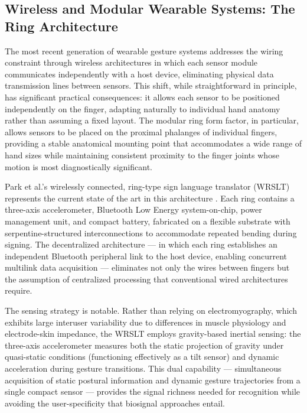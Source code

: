\documentclass[11pt, a4paper]{article}
\theoremstyle{definition}
\begin{document}
\subsection{Wireless and Modular Wearable Systems: The Ring Architecture}

The most recent generation of wearable gesture systems addresses the wiring constraint through wireless architectures in which each sensor module communicates independently with a host device, eliminating physical data transmission lines between sensors. This shift, while straightforward in principle, has significant practical consequences: it allows each sensor to be positioned independently on the finger, adapting naturally to individual hand anatomy rather than assuming a fixed layout. The modular ring form factor, in particular, allows sensors to be placed on the proximal phalanges of individual fingers, providing a stable anatomical mounting point that accommodates a wide range of hand sizes while maintaining consistent proximity to the finger joints whose motion is most diagnostically significant.

Park et al.'s wirelessly connected, ring-type sign language translator (WRSLT) represents the current state of the art in this architecture \cite{park2026}. Each ring contains a three-axis accelerometer, Bluetooth Low Energy system-on-chip, power management unit, and compact battery, fabricated on a flexible substrate with serpentine-structured interconnections to accommodate repeated bending during signing. The decentralized architecture --- in which each ring establishes an independent Bluetooth peripheral link to the host device, enabling concurrent multilink data acquisition --- eliminates not only the wires between fingers but the assumption of centralized processing that conventional wired architectures require.

The sensing strategy is notable. Rather than relying on electromyography, which exhibits large interuser variability due to differences in muscle physiology and electrode-skin impedance, the WRSLT employs gravity-based inertial sensing: the three-axis accelerometer measures both the static projection of gravity under quasi-static conditions (functioning effectively as a tilt sensor) and dynamic acceleration during gesture transitions. This dual capability --- simultaneous acquisition of static postural information and dynamic gesture trajectories from a single compact sensor --- provides the signal richness needed for recognition while avoiding the user-specificity that biosignal approaches entail.
\end{document}
